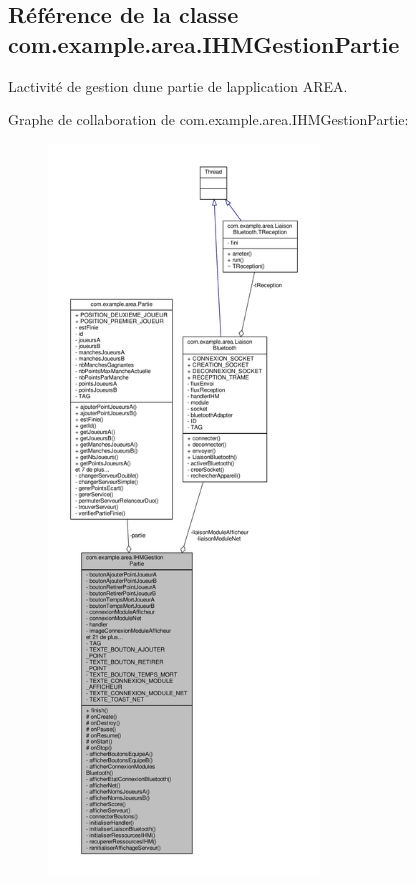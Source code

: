 \hypertarget{classcom_1_1example_1_1area_1_1_i_h_m_gestion_partie}{}\subsection{Référence de la classe com.\+example.\+area.\+I\+H\+M\+Gestion\+Partie}
\label{classcom_1_1example_1_1area_1_1_i_h_m_gestion_partie}


L\textquotesingle{}activité de gestion d\textquotesingle{}une partie de l\textquotesingle{}application A\+R\+EA.  




Graphe de collaboration de com.\+example.\+area.\+I\+H\+M\+Gestion\+Partie\+:
\nopagebreak
\begin{figure}[H]
\begin{center}
\leavevmode
\includegraphics[height=550pt]{classcom_1_1example_1_1area_1_1_i_h_m_gestion_partie__coll__graph}
\end{center}
\end{figure}
